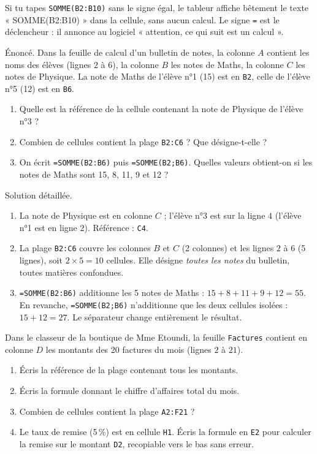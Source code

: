 \documentclass[11pt]{article}
\newcounter{popsec}
\newcounter{popsub}
\newcommand{\courssub}[1]{%
  \stepcounter{popsub}%
  \par\vspace{9pt}\noindent{\popxbold\fontsize{11.5}{13}\selectfont\color{popink}{\color{poporange}\thepopsec.\thepopsub}\hspace{6pt}#1}\par\nopagebreak\vspace{4pt}
}
\begin{document}
\begin{attention}[Le signe \texttt{=} oublié]
Si tu tapes \texttt{SOMME(B2:B10)} sans le signe égal, le tableur affiche bêtement le texte « SOMME(B2:B10) » dans la cellule, sans aucun calcul. Le signe \texttt{=} est le déclencheur : il annonce au logiciel « attention, ce qui suit est un calcul ».
\end{attention}

\courssub{Exercice résolu et entraînement}

\begin{exoresolu}
Énoncé. Dans la feuille de calcul d'un bulletin de notes, la colonne $A$ contient les noms des élèves (lignes $2$ à $6$), la colonne $B$ les notes de Maths, la colonne $C$ les notes de Physique. La note de Maths de l'élève n°1 (15) est en \texttt{B2}, celle de l'élève n°5 (12) est en \texttt{B6}.
\begin{enumerate}
\item Quelle est la référence de la cellule contenant la note de Physique de l'élève n°3 ?
\item Combien de cellules contient la plage \texttt{B2:C6} ? Que désigne-t-elle ?
\item On écrit \texttt{=SOMME(B2:B6)} puis \texttt{=SOMME(B2;B6)}. Quelles valeurs obtient-on si les notes de Maths sont 15, 8, 11, 9 et 12 ?
\end{enumerate}
\tcblower
Solution détaillée.
\begin{enumerate}
\item La note de Physique est en colonne $C$ ; l'élève n°3 est sur la ligne $4$ (l'élève n°1 est en ligne $2$). Référence : \texttt{C4}.
\item La plage \texttt{B2:C6} couvre les colonnes $B$ et $C$ (2 colonnes) et les lignes $2$ à $6$ (5 lignes), soit $2 \times 5 = 10$ cellules. Elle désigne \emph{toutes les notes} du bulletin, toutes matières confondues.
\item \texttt{=SOMME(B2:B6)} additionne les 5 notes de Maths : $15+8+11+9+12 = 55$. En revanche, \texttt{=SOMME(B2;B6)} n'additionne que les deux cellules isolées : $15+12 = 27$. Le séparateur change entièrement le résultat.
\end{enumerate}
\end{exoresolu}

\begin{exercice}
Dans le classeur de la boutique de Mme Etoundi, la feuille \texttt{Factures} contient en colonne $D$ les montants des 20 factures du mois (lignes $2$ à $21$).
\begin{enumerate}
\item Écris la référence de la plage contenant tous les montants.
\item Écris la formule donnant le chiffre d'affaires total du mois.
\item Combien de cellules contient la plage \texttt{A2:F21} ?
\item Le taux de remise (5\,\%) est en cellule \texttt{H1}. Écris la formule en \texttt{E2} pour calculer la remise sur le montant \texttt{D2}, recopiable vers le bas sans erreur.
\end{enumerate}
\end{exercice}
\end{document}
